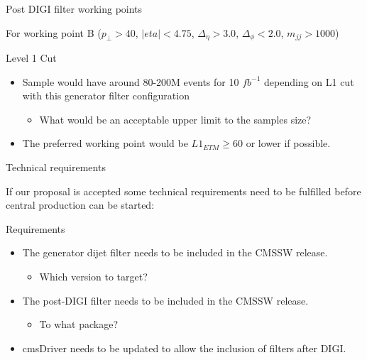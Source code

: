 \documentclass[8pt]{beamer}
\begin{document}
\begin{frame}{Post DIGI filter working points}

For working point B ($p_\perp>40$, $|eta|<4.75$, $\Delta_{\eta}>3.0$, $\Delta_{\phi}<2.0$, $m_{jj}>1000$)

\begin{block}{Level 1 Cut}

  \centering
  
  
\end{block}

\begin{itemize}
  \item Sample would have around 80-200M events for 10 $fb^{-1}$ depending on L1 cut with this generator filter configuration
  \begin{itemize}
    \item What would be an acceptable upper limit to the samples size?
  \end{itemize}
  \item The preferred working point would be $L1_{ETM}\geq60$ or lower if possible.
\end{itemize}

\end{frame}

\begin{frame}{Technical requirements}

If our proposal is accepted some technical requirements need to be fulfilled before central production can be started: 

\begin{block}{Requirements}
    
\begin{itemize}
  \item The generator dijet filter needs to be included in the CMSSW release.
  \begin{itemize} 
    \item Which version to target?
  \end{itemize}
  \item The post-DIGI filter needs to be included in the CMSSW release.
  \begin{itemize} 
    \item To what package?
  \end{itemize}
  \item cmsDriver needs to be updated to allow the inclusion of filters after DIGI.
\end{itemize}
    
\end{block}

\end{frame}
\end{document}
